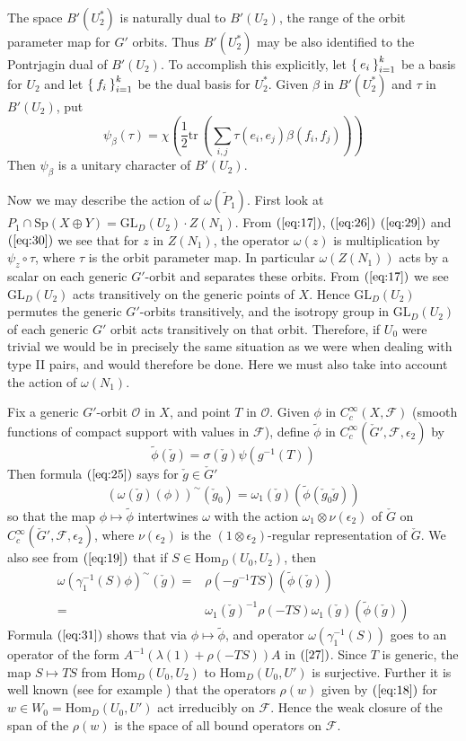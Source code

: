 \documentclass[12pt]{amsart}
\def\Sp{{\mathrm{Sp}}}
\def\GL{{\mathrm{GL}}}
\def\Hom{{\mathrm{Hom}}}
\def\tP{{\widetilde{P}}}
\def\cG{{\check{G}}}
\def\cg{{\check{g}}}
\def\tphi{{\widetilde{\phi}}}
\def\tr{{\mathrm{tr\,}}}
\def\cff{{\mathcal{F}}}
\def\coo{{\mathcal{O}}}
\begin{document}
The space $B'(U_2^*)$ is naturally dual to $B'(U_2)$, the range of 
the orbit parameter map for $G'$ orbits. Thus $B'(U_2^*)$ may be 
also identified to the Pontrjagin dual of $B'(U_2)$. To accomplish this 
explicitly, let $\Set{e_i}_{i=1}^k$ be a basis for $U_2$ 
and let $\Set{f_i}_{i=1}^k$ be the dual basis for $U_2^*$. 
Given $\beta$ in $B'(U_2^*)$ and 
$\tau$ in $B'(U_2)$, put 
\begin{equation}\label{eq:30}
\psi_\beta(\tau) = \chi(\frac{1}{2} \tr(\sum_{i,j}\tau(e_i,e_j)\beta(f_i,f_j)))
\end{equation}
Then $\psi_\beta$ is a unitary character of $B'(U_2)$.

Now we may describe the action of $\omega(\tP_1)$. 
First look at $P_1\cap \Sp(X\oplus Y) = \GL_D(U_2)\cdot Z(N_1)$.
From $(\ref{eq:17})$, $(\ref{eq:26})$ $(\ref{eq:29})$ and $(\ref{eq:30})$
we see that for $z$ in $Z(N_1)$, the operator $\omega(z)$ is multiplication 
by $\psi_z\circ \tau$, where $\tau$ is the orbit parameter map.
In particular $\omega(Z(N_1))$ acts by a scalar on each 
generic $G'$-orbit and separates these orbits. 
From $(\ref{eq:17})$ we see $\GL_D(U_2)$ acts transitively on
the generic points of $X$. Hence $\GL_D(U_2)$ permutes the 
generic $G'$-orbits transitively, and the isotropy group in $\GL_D(U_2)$
of each generic $G'$ orbit acts transitively on that orbit. 
Therefore, if $U_0$ were trivial we would be in precisely the same situation 
as we were when dealing with type II pairs, and would therefore be done.
Here we must also take into account the action of $\omega(N_1)$. 

Fix a generic $G'$-orbit $\coo$ in $X$, and point $T$ in $\coo$. 
Given $\phi$ in $C_c^\infty(X,\cff)$ (smooth functions of compact 
support with values in $\cff$), define
$\tphi$ in   $C_c^\infty(\cG',\cff,\epsilon_2)$ by
\[
\tphi(\cg)=\sigma(\cg)\psi(g^{-1}(T))
\]
Then formula $(\ref{eq:25})$ says for $\cg\in \cG'$
\[
(\omega(\cg)(\phi))^{\sim}(\cg_0) =\omega_1(\cg)(\tphi(\cg_0\cg)) 
\]
so that the map $\phi\mapsto \tphi$ intertwines $\omega$ with the action 
$\omega_1\otimes \nu(\epsilon_2)$ of $\cG$ on $C_c^\infty(\cG',\cff, \epsilon_2)$,
where $\nu(\epsilon_2)$ is the $(1\otimes \epsilon_2)$-regular representation
of $\cG$. We also see from $(\ref{eq:19})$ that if $S\in \Hom_D(U_0,U_2)$, 
then 
\begin{equation}\label{eq:31}
\begin{split}
\omega(\gamma_1^{-1}(S)\phi)^{\sim}(\cg) = & \rho(-g^{-1}TS)(\tphi(\cg))\\
=& \omega_1(\cg)^{-1} \rho(-TS)\omega_1(\cg)(\tphi(\cg))
\end{split}
\end{equation} 
Formula $(\ref{eq:31})$ shows that via $\phi\mapsto \tphi$, and
operator $\omega(\gamma_1^{-1}(S))$ goes to an 
operator of the form $A^{-1}(\lambda(1) + \rho(-TS))A$ in $(\ref{27})$. 
Since $T$ is generic, 
the map $S\mapsto TS$ from $\Hom_D(U_0,U_2)$ to $\Hom_D(U_0,U')$
is surjective. Further it is well known (see for example  \cite{Cartier1966})
that the operators $\rho(w)$ given by $(\ref{eq:18})$
for $w\in W_0=\Hom_D(U_0,U')$ act irreducibly on $\cff$. Hence 
the weak closure of the span of the $\rho(w)$ is the space of 
all bound operators on $\cff$. 
\end{document}
